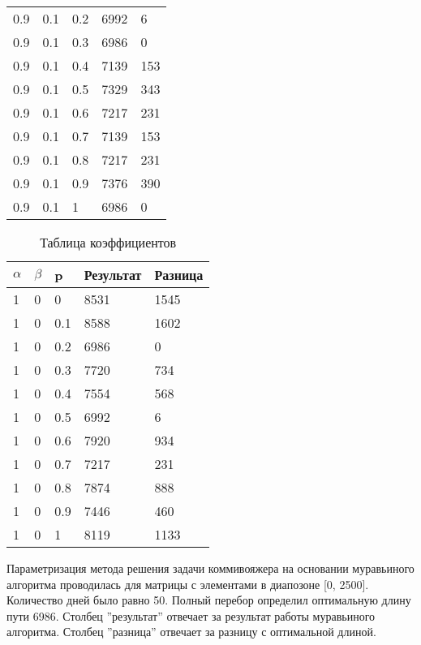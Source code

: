 \begin{table}[ht]
\begin{tabular}{ | l | l | l | l | l |}
		0.9      & 0.1     & 0.2 & 6992      & 6       \\
		0.9      & 0.1     & 0.3 & 6986      & 0       \\
		0.9      & 0.1     & 0.4 & 7139      & 153     \\
		0.9      & 0.1     & 0.5 & 7329      & 343     \\
		0.9      & 0.1     & 0.6 & 7217      & 231     \\
		0.9      & 0.1     & 0.7 & 7139      & 153     \\
		0.9      & 0.1     & 0.8 & 7217      & 231     \\
		0.9      & 0.1     & 0.9 & 7376      & 390     \\
		0.9      & 0.1     & 1   & 6986      & 0       \\
		\hline
	\end{tabular}
\end{table}


\begin{table}[ht]
	\centering
	\caption{Таблица коэффициентов}
	\label{table:ref1}
	\begin{tabular}{ | l | l | l | l | l |}
		\hline
		$\alpha$ & $\beta$ & p   & Результат & Разница \\
		\hline
		1        & 0       & 0   & 8531      & 1545    \\
		1        & 0       & 0.1 & 8588      & 1602    \\
		1        & 0       & 0.2 & 6986      & 0       \\
		1        & 0       & 0.3 & 7720      & 734     \\
		1        & 0       & 0.4 & 7554      & 568     \\
		1        & 0       & 0.5 & 6992      & 6       \\
		1        & 0       & 0.6 & 7920      & 934     \\
		1        & 0       & 0.7 & 7217      & 231     \\
		1        & 0       & 0.8 & 7874      & 888     \\
		1        & 0       & 0.9 & 7446      & 460     \\
		1        & 0       & 1   & 8119      & 1133    \\
		\hline
	\end{tabular}
\end{table}

\newpage

Параметризация метода решения задачи коммивояжера
на основании муравьиного алгоритма проводилась для матрицы с
элементами в диапозоне [0, 2500].
Количество дней было равно 50.
Полный перебор определил оптимальную длину пути 6986.
Столбец ''результат'' отвечает за результат работы муравьиного алгоритма.
Столбец ''разница'' отвечает за разницу с оптимальной длиной.




